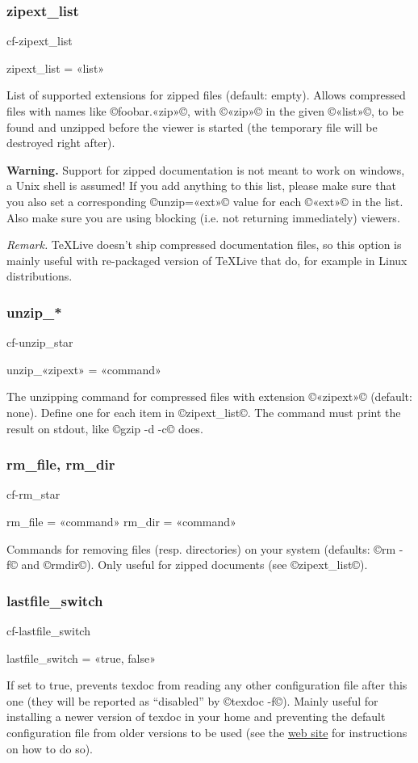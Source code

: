 \documentclass[a4paper, oneside]{scrartcl}
\newcommand\texlive{%
  \TeX\thinspace Live\xspace}
\newif\ifframed
\newenvironment{cmdsubsub}[2]{%
  \framedfalse \commandes\subsubsection{#1}{#2}%
  }{%
  \endcommandes}
\begin{document}
\begin{cmdsubsub}{zipext_list}{cf-zipext_list}
  zipext_list = «list»
\end{cmdsubsub}

List of supported extensions for zipped files (default: empty).  Allows
compressed files with names like ©foobar.«zip»©, with ©«zip»© in the given
©«list»©, to be found and unzipped before the viewer is started (the
temporary file will be destroyed right after).

\textbf{Warning.} Support for zipped documentation is not meant to work on
windows, a Unix shell is assumed! If you add anything to this list, please
make sure that you also set a corresponding ©unzip=«ext»© value for each
©«ext»© in the list. Also make sure you are using blocking (i.e. not returning
immediately) viewers.

\textit{Remark.} \texlive doesn't ship compressed documentation files, so
this option is mainly useful with re-packaged version of \texlive that do,
for example in Linux distributions.

\begin{cmdsubsub}{unzip_*}{cf-unzip_star}
  unzip_«zipext» = «command»
\end{cmdsubsub}

The unzipping command for compressed files with extension ©«zipext»© (default:
none). Define one for each item in ©zipext_list©. The command must print
the result on stdout, like ©gzip -d -c© does.

\begin{cmdsubsub}{rm_file, rm_dir}{cf-rm_star}
  rm_file = «command»
  rm_dir  = «command»
\end{cmdsubsub}

Commands for removing files (resp. directories) on your system (defaults:
©rm -f© and ©rmdir©). Only useful for zipped documents (see ©zipext_list©).

\begin{cmdsubsub}{lastfile_switch}{cf-lastfile_switch}
  lastfile_switch = «true, false»
\end{cmdsubsub}

If set to true, prevents texdoc from reading any other configuration file
after this one (they will be reported as ``disabled'' by ©texdoc -f©).  Mainly
useful for installing a newer version of texdoc in your home and preventing
the default configuration file from older versions to be used (see the
\href{http://tug.org/texdoc/}{web site} for instructions on how to do so).
\end{document}
